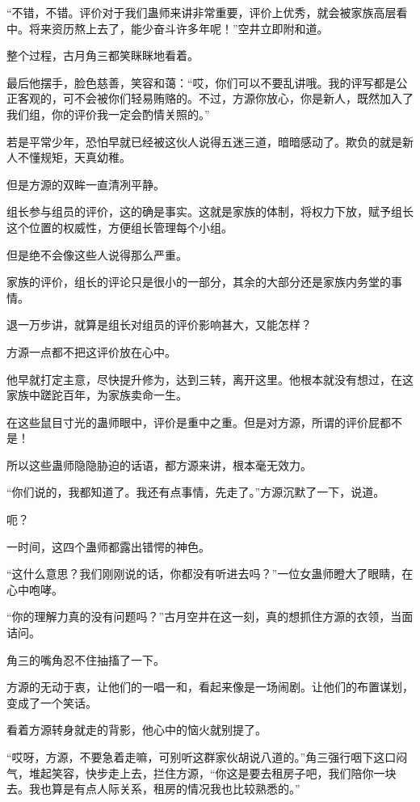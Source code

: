 \begin{this_body}
“不错，不错。评价对于我们蛊师来讲非常重要，评价上优秀，就会被家族高层看中。将来资历熬上去了，能少奋斗许多年呢！”空井立即附和道。

整个过程，古月角三都笑眯眯地看着。

最后他摆手，脸色慈善，笑容和蔼：“哎，你们可以不要乱讲哦。我的评写都是公正客观的，可不会被你们轻易贿赂的。不过，方源你放心，你是新人，既然加入了我们组，你的评价我一定会酌情关照的。”

若是平常少年，恐怕早就已经被这伙人说得五迷三道，暗暗感动了。欺负的就是新人不懂规矩，天真幼稚。

但是方源的双眸一直清冽平静。

组长参与组员的评价，这的确是事实。这就是家族的体制，将权力下放，赋予组长这个位置的权威性，方便组长管理每个小组。

但是绝不会像这些人说得那么严重。

家族的评价，组长的评论只是很小的一部分，其余的大部分还是家族内务堂的事情。

退一万步讲，就算是组长对组员的评价影响甚大，又能怎样？

方源一点都不把这评价放在心中。

他早就打定主意，尽快提升修为，达到三转，离开这里。他根本就没有想过，在这家族中蹉跎百年，为家族卖命一生。

在这些鼠目寸光的蛊师眼中，评价是重中之重。但是对方源，所谓的评价屁都不是！

所以这些蛊师隐隐胁迫的话语，都方源来讲，根本毫无效力。

“你们说的，我都知道了。我还有点事情，先走了。”方源沉默了一下，说道。

呃？

一时间，这四个蛊师都露出错愕的神色。

“这什么意思？我们刚刚说的话，你都没有听进去吗？”一位女蛊师瞪大了眼睛，在心中咆哮。

“你的理解力真的没有问题吗？”古月空井在这一刻，真的想抓住方源的衣领，当面诘问。

角三的嘴角忍不住抽搐了一下。

方源的无动于衷，让他们的一唱一和，看起来像是一场闹剧。让他们的布置谋划，变成了一个笑话。

看着方源转身就走的背影，他心中的恼火就别提了。

“哎呀，方源，不要急着走嘛，可别听这群家伙胡说八道的。”角三强行咽下这口闷气，堆起笑容，快步走上去，拦住方源，“你这是要去租房子吧，我们陪你一块去。我也算是有点人际关系，租房的情况我也比较熟悉的。”


\end{this_body}
